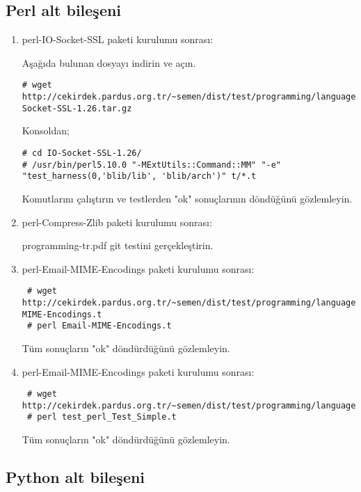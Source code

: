 \documentclass[a4paper,10pt]{article}
\begin{document}
\subsection{Perl alt bileşeni}
\begin{enumerate}
\item perl-IO-Socket-SSL paketi kurulumu sonrası:

Aşağıda bulunan dosyayı indirin ve açın.
\begin{verbatim}
# wget http://cekirdek.pardus.org.tr/~semen/dist/test/programming/language/perl/IO-Socket-SSL-1.26.tar.gz
\end{verbatim}

Konsoldan;
\begin{verbatim}
# cd IO-Socket-SSL-1.26/
# /usr/bin/perl5.10.0 "-MExtUtils::Command::MM" "-e" "test_harness(0,'blib/lib', 'blib/arch')" t/*.t
\end{verbatim}

Komutlarını çalıştırın ve testlerden "ok" sonuçlarının döndüğünü gözlemleyin.
\item perl-Compress-Zlib paketi kurulumu sonrası:

programming-tr.pdf git testini gerçekleştirin.

\item perl-Email-MIME-Encodings paketi kurulumu sonrası:
\begin{verbatim}
 # wget http://cekirdek.pardus.org.tr/~semen/dist/test/programming/language/perl/Email-MIME-Encodings.t
 # perl Email-MIME-Encodings.t
\end{verbatim}

Tüm sonuçların "ok" döndürdüğünü gözlemleyin. 

\item perl-Email-MIME-Encodings paketi kurulumu sonrası:
\begin{verbatim}
 # wget http://cekirdek.pardus.org.tr/~semen/dist/test/programming/language/perl/test_perl_Test_Simple.t
 # perl test_perl_Test_Simple.t
\end{verbatim}

Tüm sonuçların "ok" döndürdüğünü gözlemleyin. 


\end{enumerate}
\subsection{Python alt bileşeni}
\end{document}

